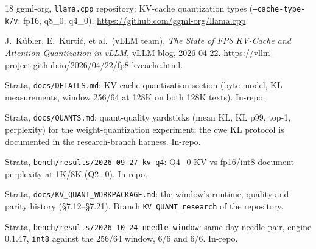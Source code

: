 \documentclass[10pt,twocolumn]{article}
\begin{document}
\begin{thebibliography}{18}
ggml-org, \texttt{llama.cpp} repository:
KV-cache quantization types (\texttt{--cache-type-k/v}: fp16, q8\_0, q4\_0).
\url{https://github.com/ggml-org/llama.cpp}.

J.~K{\"u}bler, E.~Kurti{\'c}, et al.\ (vLLM team), \emph{The State of FP8 KV-Cache and Attention Quantization in vLLM}, vLLM blog, 2026-04-22.
\url{https://vllm-project.github.io/2026/04/22/fp8-kvcache.html}.

Strata, \texttt{docs/DETAILS.md}: KV-cache quantization section (byte model, KL measurements, window 256/64 at 128K on both 128K texts). In-repo.

Strata, \texttt{docs/QUANTS.md}: quant-quality yardsticks (mean KL, KL p99, top-1, perplexity) for the weight-quantization experiment; the cwe KL protocol is documented in the research-branch harness. In-repo.

Strata, \texttt{bench/results/2026-09-27-kv-q4}: Q4\_0 KV vs fp16/int8 document perplexity at 1K/8K (Q2\_0). In-repo.

Strata, \texttt{docs/KV\_QUANT\_WORKPACKAGE.md}: the window's runtime, quality and parity history (\S7.12--\S7.21). Branch \texttt{KV\_QUANT\_research} of the repository.

Strata, \texttt{bench/results/2026-10-24-needle-window}: same-day needle pair, engine 0.1.47, \texttt{int8} against the 256/64 window, 6/6 and 6/6. In-repo.

\end{thebibliography}
\end{document}
